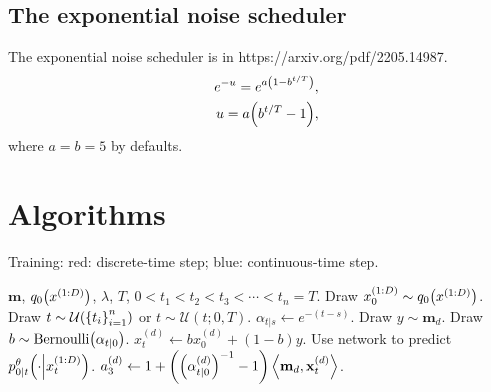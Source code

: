 \documentclass[10pt]{article}
\begin{document}
\subsection{The exponential noise scheduler}
The exponential noise scheduler is in https://arxiv.org/pdf/2205.14987.
\begin{eqnarray*}
  &&e^{-u} = e^{a\qty(1-b^{t/T})},\\
  &&u = a\qty(b^{t/T} - 1),
\end{eqnarray*}
where $a=b=5$ by defaults.

\section{Algorithms}

\begin{algorithm}
  \caption{Training: {\color{red} red: discrete-time step}; {\color{blue} blue: continuous-time step}.}
  \label{TrainAlg}
  \begin{algorithmic}
    \Require $\mathbf{m}$, $q_0\qty(x^{(1:D)})$, $\lambda$, $T$, $0<t_1<t_2<t_3<\cdots<t_n=T$.
    \Repeat
    \State Draw $x^{(1:D)}_0\sim q_0\qty(x^{(1:D)})$.
    \State Draw {\color{red} $t\sim\mathcal{U}\qty(\qty{t_i}_{i=1}^n)$} or {\color{blue} $t\sim\mathcal{U}(t;0,T)$}.
    \State $\alpha_{t|s}\gets e^{-(t-s)}$.
    \State Draw $y\sim \mathbf{m}_d$.
    \State Draw $b\sim \text{Bernoulli}\qty(\alpha_{t|0})$.
    \State $x^{(d)}_t \gets bx^{(d)}_0 + (1-b)y$.
    \EndFor
    \State Use network to predict $p^\theta_{0|t}\qty(\cdot\middle|x^{(1:D)}_t)$.
    \State \State $a^{(d)}_3\gets 1+\qty(\qty(\alpha^{(d)}_{t|0})^{-1}-1)\left\langle\mathbf{m}_d, \mathbf{x}^{(d)}_t\right\rangle$.
    \EndFor

\end{algorithmic}
\end{algorithm}
\end{document}
